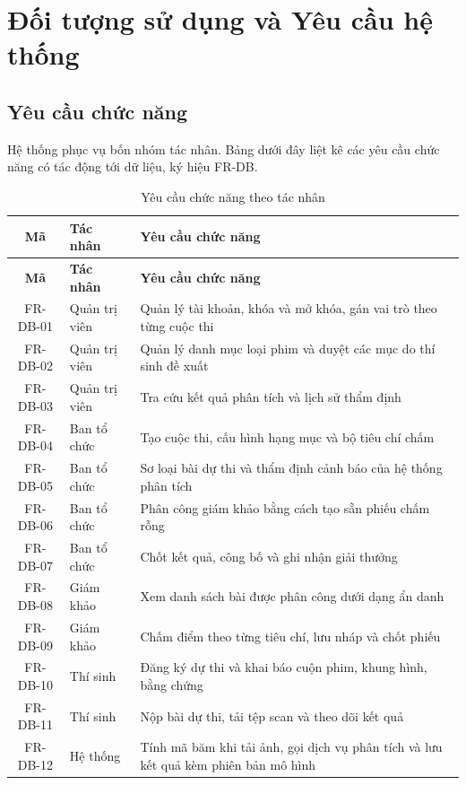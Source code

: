 \section{Đối tượng sử dụng và Yêu cầu hệ thống}

\subsection{Yêu cầu chức năng}

Hệ thống phục vụ bốn nhóm tác nhân. Bảng dưới đây liệt kê các yêu cầu chức năng có tác động tới dữ liệu, ký hiệu FR-DB.


\begin{longtable}{|c|p{2.6cm}|p{8.6cm}|}
\caption{Yêu cầu chức năng theo tác nhân} \\
\hline
\textbf{Mã} & \textbf{Tác nhân} & \textbf{Yêu cầu chức năng} \\ \hline
\endfirsthead
\hline
\textbf{Mã} & \textbf{Tác nhân} & \textbf{Yêu cầu chức năng} \\ \hline
\endhead
FR-DB-01 & Quản trị viên & Quản lý tài khoản, khóa và mở khóa, gán vai trò theo từng cuộc thi \\ \hline
FR-DB-02 & Quản trị viên & Quản lý danh mục loại phim và duyệt các mục do thí sinh đề xuất \\ \hline
FR-DB-03 & Quản trị viên & Tra cứu kết quả phân tích và lịch sử thẩm định \\ \hline
FR-DB-04 & Ban tổ chức & Tạo cuộc thi, cấu hình hạng mục và bộ tiêu chí chấm \\ \hline
FR-DB-05 & Ban tổ chức & Sơ loại bài dự thi và thẩm định cảnh báo của hệ thống phân tích \\ \hline
FR-DB-06 & Ban tổ chức & Phân công giám khảo bằng cách tạo sẵn phiếu chấm rỗng \\ \hline
FR-DB-07 & Ban tổ chức & Chốt kết quả, công bố và ghi nhận giải thưởng \\ \hline
FR-DB-08 & Giám khảo & Xem danh sách bài được phân công dưới dạng ẩn danh \\ \hline
FR-DB-09 & Giám khảo & Chấm điểm theo từng tiêu chí, lưu nháp và chốt phiếu \\ \hline
FR-DB-10 & Thí sinh & Đăng ký dự thi và khai báo cuộn phim, khung hình, bằng chứng \\ \hline
FR-DB-11 & Thí sinh & Nộp bài dự thi, tải tệp scan và theo dõi kết quả \\ \hline
FR-DB-12 & Hệ thống & Tính mã băm khi tải ảnh, gọi dịch vụ phân tích và lưu kết quả kèm phiên bản mô hình \\ \hline
\end{longtable}


